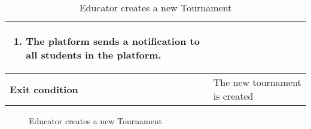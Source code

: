 \begin{enumerate}[label=\textbf{UC\arabic*}:,leftmargin=1.3cm]
\begin{table}[H]
\begin{tabular}{|l|p{11.9cm}|}
\begin{enumerate}[label=\arabic*.]
                              \item The platform sends a notification to all students in the platform.
                        \end{enumerate} \\\hline
                        \textbf{Exit condition}  & The new tournament is created                                                                     \\\hline
                  \end{tabular}
                  \caption{Educator creates a new Tournament }
                  \label{table:Educator creates a new Tournament }
            \end{table}

            \begin{figure}[H]
                  \centering
                  \caption{Educator creates a new Tournament }
                  \label{fig:Educator creates a new Tournament }
            \end{figure}
            \pagebreak


\end{enumerate}
